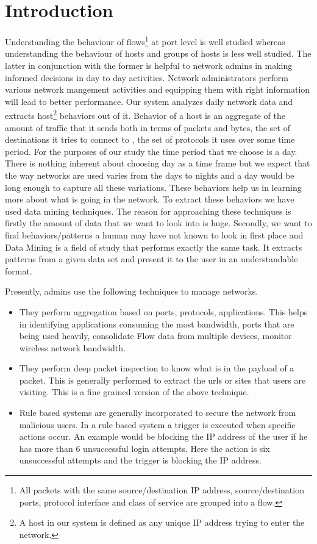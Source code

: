 
\chapter{Introduction}

Understanding the behaviour of flows\footnote{All packets with the same source/destination IP address, source/destination ports, protocol interface and class of service are grouped into a flow.} at port level is well studied whereas understanding the behaviour of hosts and groups of hosts is less well studied. The latter in conjunction with the former is helpful to network admins in making informed decisions in day to day activities. Network administrators perform various network mangement activities and equipping them with right information will lead to better performance. 
Our system analyzes daily network data and extracts host\footnote{A host in our system is defined as any unique IP address trying to enter the network.} behaviors out of it.  Behavior of a host is an aggregate of the amount of traffic that it sends both in terms of packets and bytes, the set of destinations it tries to connect to , the set of protocols it uses over some time period. For the purposes of our study the time period that we choose is a day. There is nothing inherent about choosing day as a time frame but we expect that the way networks are used varies from the days to nights and a day would be long enough to capture all these variations. These behaviors help us in learning more about what is going in the network. To extract these behaviors we have used data mining techniques. The reason for approaching these techniques is firstly the amount of data that we want to look into is huge. Secondly, we want to find behaviors/patterns a human may have not known to look in first place and Data Mining is a field of study that performs exactly the same task. It extracts patterns from a given data set and present it to the user in an understandable format.

Presently, admins use the following techniques to manage networks. 
\begin{itemize}
	\item They perform aggregation based on ports, protocols, applications. This helps in identifying applications consuming the most bandwidth, ports that are being used heavily, consolidate Flow data from multiple devices, monitor wireless network bandwidth.
	
	\item They perform deep packet inspection to know what is in the payload of a packet. This is generally performed to extract the urls or sites that users are  visiting. This is a fine grained version of the above technique.
	
	\item Rule based systems are generally incorporated to secure the network from malicious users. In a rule based system a trigger is executed when specific actions occur. An example would be blocking the IP address of the user if he has more than 6 unsuccessful login attempts. Here the action is six unsuccessful attempts and the trigger is blocking the IP address. 
\end{itemize}


